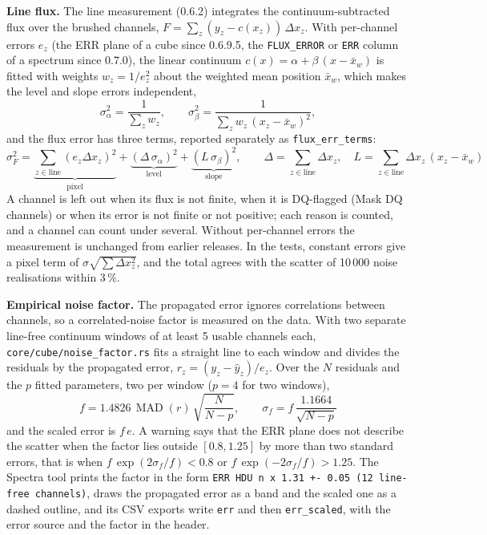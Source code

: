 \documentclass[11pt,a4paper]{article}
\newcommand{\code}[1]{\texttt{\small #1}}
\begin{document}
    \textbf{Line flux.} The line measurement (0.6.2) integrates the continuum-subtracted flux over the brushed channels, $F = \sum_z (y_z - c(x_z))\,\Delta x_z$. With per-channel errors $e_z$ (the ERR plane of a cube since 0.6.9.5, the \code{FLUX\_ERROR} or \code{ERR} column of a spectrum since 0.7.0), the linear continuum $c(x) = \alpha + \beta\,(x - \bar{x}_w)$ is fitted with weights $w_z = 1/e_z^2$ about the weighted mean position $\bar{x}_w$, which makes the level and slope errors independent,
    \begin{equation}
        \sigma_\alpha^2 = \frac{1}{\sum_z w_z}, \qquad \sigma_\beta^2 = \frac{1}{\sum_z w_z\, (x_z - \bar{x}_w)^2},
    \end{equation}
    and the flux error has three terms, reported separately as \code{flux\_err\_terms}:
    \begin{equation}
        \boxed{
            \sigma_F^2 = \underbrace{\sum_{z \in \text{line}} \left(e_z \Delta x_z\right)^2}_{\text{pixel}}
            + \underbrace{\left(\Delta\, \sigma_\alpha\right)^2}_{\text{level}}
            + \underbrace{\left(L\, \sigma_\beta\right)^2}_{\text{slope}},
            \qquad \Delta = \sum_{z \in \text{line}} \Delta x_z, \quad L = \sum_{z \in \text{line}} \Delta x_z\, (x_z - \bar{x}_w)
        }
    \end{equation}
    A channel is left out when its flux is not finite, when it is DQ-flagged (Mask DQ channels) or when its error is not finite or not positive; each reason is counted, and a channel can count under several. Without per-channel errors the measurement is unchanged from earlier releases. In the tests, constant errors give a pixel term of $\sigma \sqrt{\sum \Delta x_z^2}$, and the total agrees with the scatter of 10\,000 noise realisations within 3\,\%.

    \textbf{Empirical noise factor.} The propagated error ignores correlations between channels, so a correlated-noise factor is measured on the data. With two separate line-free continuum windows of at least 5 usable channels each, \code{core/cube/noise\_factor.rs} fits a straight line to each window and divides the residuals by the propagated error, $r_z = (y_z - \hat{y}_z)/e_z$. Over the $N$ residuals and the $p$ fitted parameters, two per window ($p = 4$ for two windows),
    \begin{equation}
        \boxed{
            f = 1.4826\,\operatorname{MAD}(r)\,\sqrt{\frac{N}{N - p}}, \qquad
            \sigma_f = f\,\frac{1.1664}{\sqrt{N - p}}
        }
    \end{equation}
    and the scaled error is $f\,e$. A warning says that the ERR plane does not describe the scatter when the factor lies outside $[0.8, 1.25]$ by more than two standard errors, that is when $f\,\exp(2\sigma_f/f) < 0.8$ or $f\,\exp(-2\sigma_f/f) > 1.25$. The Spectra tool prints the factor in the form \code{ERR HDU n x 1.31 +- 0.05 (12 line-free channels)}, draws the propagated error as a band and the scaled one as a dashed outline, and its CSV exports write \code{err} and then \code{err\_scaled}, with the error source and the factor in the header.
\end{document}
